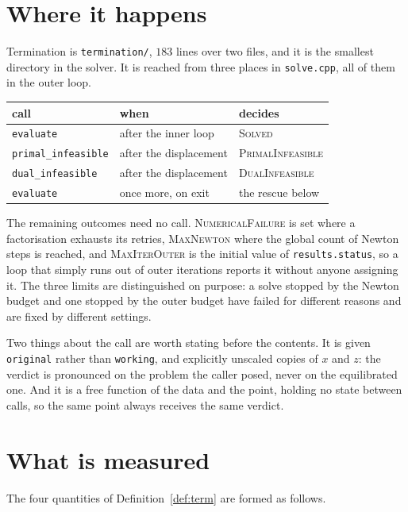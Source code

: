 \documentclass[a4paper,11pt]{book}
\theoremstyle{plain}
\theoremstyle{definition}
\theoremstyle{remark}
\numberwithin{equation}{chapter}
\numberwithin{algorithm}{chapter}
\begin{document}
	\section{Where it happens}

	Termination is \texttt{termination/}, $183$ lines over two files, and it is
	the smallest directory in the solver. It is reached from three places in
	\texttt{solve.cpp}, all of them in the outer loop.

	\begin{table}[H]
		\centering\small
		\begin{tabular}{lll}
			\toprule
			call & when & decides\\
			\midrule
			\texttt{evaluate} & after the inner loop & \textsc{Solved}\\
			\texttt{primal\_infeasible} & after the displacement
			& \textsc{PrimalInfeasible}\\
			\texttt{dual\_infeasible} & after the displacement
			& \textsc{DualInfeasible}\\
			\texttt{evaluate} & once more, on exit & the rescue below\\
			\bottomrule
		\end{tabular}
	\end{table}

	The remaining outcomes need no call. \textsc{NumericalFailure} is set where a
	factorisation exhausts its retries, \textsc{MaxNewton} where the global count
	of Newton steps is reached, and \textsc{MaxIterOuter} is the initial value of
	\texttt{results.status}, so a loop that simply runs out of outer iterations
	reports it without anyone assigning it. The three limits are distinguished on
	purpose: a solve stopped by the Newton budget and one stopped by the outer
	budget have failed for different reasons and are fixed by different settings.

	Two things about the call are worth stating before the contents. It is given
	\texttt{original} rather than \texttt{working}, and explicitly unscaled copies
	of $x$ and $z$: the verdict is pronounced on the problem the caller posed,
	never on the equilibrated one. And it is a free function of the data and the
	point, holding no state between calls, so the same point always receives the
	same verdict.

	\section{What is measured}

	The four quantities of Definition~\ref{def:term} are formed as follows.
\end{document}
